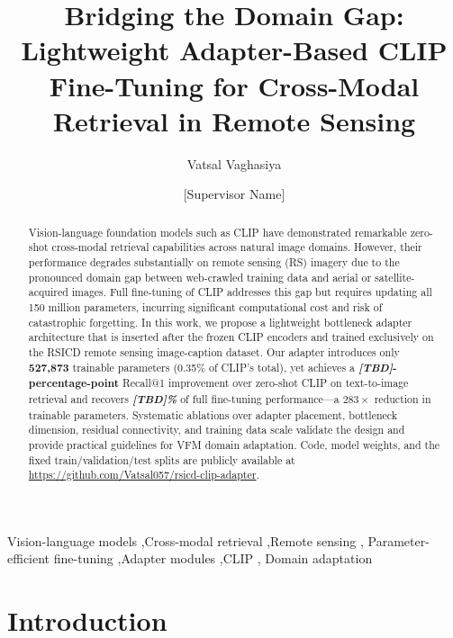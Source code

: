 \documentclass[review,12pt]{elsarticle}
\begin{document}
\begin{frontmatter}

\title{Bridging the Domain Gap: Lightweight Adapter-Based CLIP Fine-Tuning
       for Cross-Modal Retrieval in Remote Sensing}

\author[1]{Vatsal Vaghasiya}
\author[1]{[Supervisor Name]}
\address[1]{Department of Data Science, M.S. Ramaiah University of Applied Sciences,
            Bengaluru, India}

\begin{abstract}
Vision-language foundation models such as CLIP have demonstrated remarkable
zero-shot cross-modal retrieval capabilities across natural image domains.
However, their performance degrades substantially on remote sensing (RS)
imagery due to the pronounced domain gap between web-crawled training data
and aerial or satellite-acquired images. Full fine-tuning of CLIP addresses
this gap but requires updating all 150 million parameters, incurring
significant computational cost and risk of catastrophic forgetting. In
this work, we propose a lightweight bottleneck adapter architecture that
is inserted after the frozen CLIP encoders and trained exclusively on the
RSICD remote sensing image-caption dataset. Our adapter introduces only
\textbf{527,873} trainable parameters (0.35\% of CLIP's total), yet
achieves a \textbf{\textit{[TBD]}-percentage-point} Recall@1 improvement
over zero-shot CLIP on text-to-image retrieval and recovers
\textbf{\textit{[TBD]\%}} of full fine-tuning performance---a
$283\times$ reduction in trainable parameters. Systematic ablations over
adapter placement, bottleneck dimension, residual connectivity, and
training data scale validate the design and provide practical guidelines
for VFM domain adaptation. Code, model weights, and the fixed
train/validation/test splits are publicly available at
\url{https://github.com/Vatsal057/rsicd-clip-adapter}.
\end{abstract}

\begin{keyword}
Vision-language models \sep Cross-modal retrieval \sep Remote sensing \sep
Parameter-efficient fine-tuning \sep Adapter modules \sep CLIP \sep
Domain adaptation
\end{keyword}

\end{frontmatter}

\section{Introduction}
\label{sec:intro}
\end{document}
